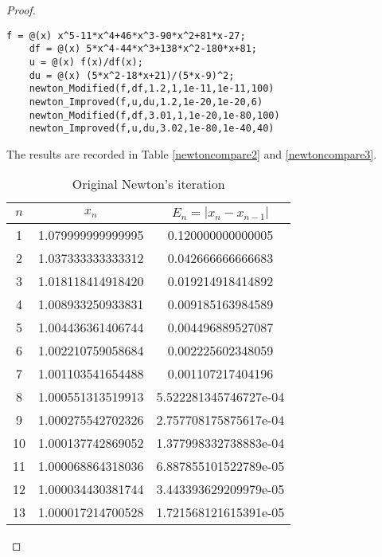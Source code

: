 \begin{enumerate}
\begin{proof}
\begin{lstlisting}[style=Matlab-editor]
	f = @(x) x^5-11*x^4+46*x^3-90*x^2+81*x-27;
	df = @(x) 5*x^4-44*x^3+138*x^2-180*x+81;
	u = @(x) f(x)/df(x);
	du = @(x) (5*x^2-18*x+21)/(5*x-9)^2;
	newton_Modified(f,df,1.2,1,1e-11,1e-11,100)
	newton_Improved(f,u,du,1.2,1e-20,1e-20,6)
	newton_Modified(f,df,3.01,1,1e-20,1e-80,100)
	newton_Improved(f,u,du,3.02,1e-80,1e-40,40)
	\end{lstlisting}
	The results are recorded in Table \ref{newtoncompare2} and \ref{newtoncompare3}.
	\begin{table}[htbp]
		\begin{subtable}[t]{.49\linewidth}
			\centering
			\caption{Original Newton's iteration}
			\begin{tabular}[t]{|c|c|c|}
			\hline
			$n$	&	\(x_n\)				&	\(E_n=|x_n-x_{n-1}|\)	\\	\hline
			\footnotesize	1	&	\footnotesize	1.079999999999995	&	\footnotesize	0.120000000000005	\\	\hline
			\footnotesize	2	&	\footnotesize	1.037333333333312	&	\footnotesize	0.042666666666683	\\	\hline
			\footnotesize	3	&	\footnotesize	1.018118414918420	&	\footnotesize	0.019214918414892	\\	\hline
			\footnotesize	4	&	\footnotesize	1.008933250933831	&	\footnotesize	0.009185163984589	\\	\hline
			\footnotesize	5	&	\footnotesize	1.004436361406744	&	\footnotesize	0.004496889527087	\\	\hline
			\footnotesize	6	&	\footnotesize	1.002210759058684	&	\footnotesize	0.002225602348059	\\	\hline
			\footnotesize	7	&	\footnotesize	1.001103541654488	&	\footnotesize	0.001107217404196	\\	\hline
			\footnotesize	8	&	\footnotesize	1.000551313519913	&	\footnotesize	5.522281345746727e-04	\\	\hline
			\footnotesize	9	&	\footnotesize	1.000275542702326	&	\footnotesize	2.757708175875617e-04	\\	\hline
			\footnotesize	10	&	\footnotesize	1.000137742869052	&	\footnotesize	1.377998332738883e-04	\\	\hline
			\footnotesize	11	&	\footnotesize	1.000068864318036	&	\footnotesize	6.887855101522789e-05	\\	\hline
			\footnotesize	12	&	\footnotesize	1.000034430381744	&	\footnotesize	3.443393629209979e-05	\\	\hline
			\footnotesize	13	&	\footnotesize	1.000017214700528	&	\footnotesize	1.721568121615391e-05	\\	\hline

\end{tabular}
\end{subtable}
\end{table}
\end{proof}
\end{enumerate}
